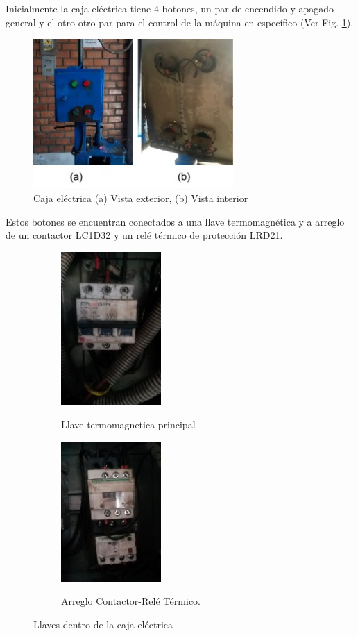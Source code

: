\documentclass[main_conf.tex]{subfiles}
\begin{document}
Inicialmente la caja eléctrica tiene 4 botones, un par de encendido y
apagado general y el otro otro par para el control de la máquina en 
específico (Ver Fig. \ref{caja_electrica_tapa}).

\begin{figure}[!t]
  \centering
  \includegraphics[width=3.0in]{../img/caja_electrica/tapa.jpg}
  \caption{Caja eléctrica (a) Vista exterior, (b) Vista interior}
  \label{caja_electrica_tapa}
\end{figure}

Estos botones se encuentran conectados a una llave termomagnética
y a arreglo de un contactor LC1D32 y un relé térmico de protección
LRD21.


\begin{figure}[t]
  \centering
  \begin{subfigure}[b]{0.5\textwidth}
    \centering
    \includegraphics[width=1.5in]{../img/caja_electrica/llave_a.png}
    \label{caja_electrica_llave_a}
    \caption{Llave termomagnetica principal}
  \end{subfigure}
     
  \begin{subfigure}[b]{0.5\textwidth}
    \centering
    \includegraphics[width=1.5in]{../img/caja_electrica/llave_b.png}
    \label{caja_electrica_llave_b}
    \caption{Arreglo Contactor-Relé Térmico.}
  \end{subfigure}

  \caption{Llaves dentro de la caja eléctrica}
  \label{caja_electrica_llaves}
\end{figure}
 
\end{document}
